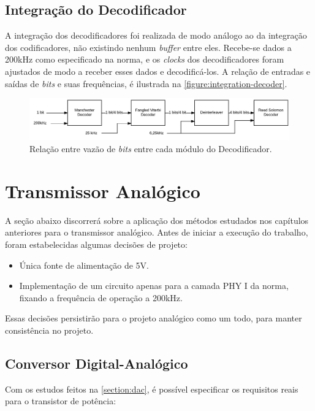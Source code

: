 	\subsection{Integração do Decodificador}\label{section:execution-integration-decoder-speeds}
	A integração dos decodificadores foi realizada de modo análogo ao da integração dos codificadores, não existindo nenhum \textit{buffer} entre eles. Recebe-se dados a 200kHz como especificado na norma, e os \textit{clocks} dos decodificadores foram ajustados de modo a receber esses dados e decodificá-los. A relação de entradas e saídas de \textit{bits} e suas frequências, é ilustrada na \autoref{figure:integration-decoder}.
	\begin{figure}[h]
		\caption{\label{figure:integration-decoder}Relação entre vazão de \textit{bits} entre cada módulo do Decodificador.}
		\centering
		\includegraphics[width=1\textwidth]{integration/speeds-decoder.pdf}
	\end{figure}

	\section{Transmissor Analógico}
	A seção abaixo discorrerá sobre a aplicação dos métodos estudados nos capítulos anteriores para o transmissor analógico.
	Antes de iniciar a execução do trabalho, foram estabelecidas algumas decisões de projeto:

	\begin{itemize}
		\item Única fonte de alimentação de 5V.
		\item Implementação de um circuito apenas para a camada PHY I da norma, fixando a frequência de operação a 200kHz.
	\end{itemize}

	Essas decisões persistirão para o projeto analógico como um todo, para manter consistência no projeto.

	\subsection{Conversor Digital-Analógico}
	Com os estudos feitos na \autoref{section:dac}, é possível especificar os requisitos reais para o transistor de potência:

